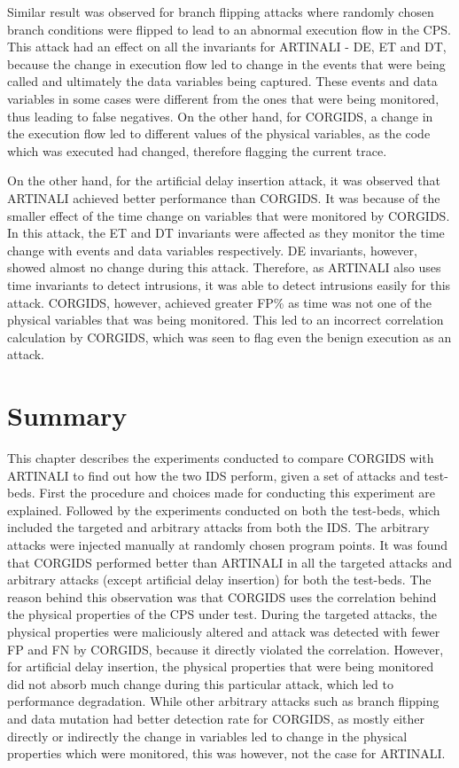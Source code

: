 Similar result was observed for branch flipping attacks where randomly chosen branch conditions were flipped to lead to an abnormal execution flow in the \ac{CPS}. This attack had an effect on all the invariants for ARTINALI -  D\textbar E, E\textbar T and D\textbar T, because the change in execution flow led to change in the events that were being called and ultimately the data variables being captured. These events and data variables in some cases were different from the ones that were being monitored, thus leading to false negatives. On the other hand, for \ac{CORGIDS}, a change in the execution flow led to different values of the physical variables, as the code which was executed had changed, therefore flagging the current trace.

On the other hand, for the artificial delay insertion attack, it was observed that ARTINALI achieved better performance than \ac{CORGIDS}. It was because of the smaller effect of the time change on variables that were monitored by \ac{CORGIDS}. In this attack, the E\textbar T and D\textbar T invariants were affected as they monitor the time change with events and data variables respectively. D\textbar E invariants, however, showed almost no change during this attack. Therefore, as ARTINALI also uses time invariants to detect intrusions, it was able to detect intrusions easily for this attack. \ac{CORGIDS}, however, achieved greater \ac{FP}\% as time was not one of the physical variables that was being monitored. This led to an incorrect correlation calculation by \ac{CORGIDS}, which was seen to flag even the benign execution as an attack.

\section{Summary}
This chapter describes the experiments conducted to compare \ac{CORGIDS} with ARTINALI to find out how the two \ac{IDS} perform, given a set of attacks and test-beds. First the procedure and choices made for conducting this experiment are explained. Followed by the experiments conducted on both the test-beds, which included the targeted and arbitrary attacks from both the \ac{IDS}. The arbitrary attacks were injected manually at randomly chosen program points. It was found that \ac{CORGIDS} performed better than ARTINALI in all the targeted attacks and arbitrary attacks (except artificial delay insertion) for both the test-beds. The reason behind this observation was that \ac{CORGIDS} uses the correlation behind the physical properties of the \ac{CPS} under test. During the targeted attacks, the physical properties were maliciously altered and attack was detected with fewer \ac{FP} and \ac{FN} by \ac{CORGIDS}, because it directly violated the correlation. However, for artificial delay insertion, the physical properties that were being monitored did not absorb much change during this particular attack, which led to performance degradation. While other arbitrary attacks such as branch flipping and data mutation had better detection rate for \ac{CORGIDS}, as mostly either directly or indirectly the change in variables led to change in the physical properties which were monitored, this was however, not the case for ARTINALI.



\endinput
